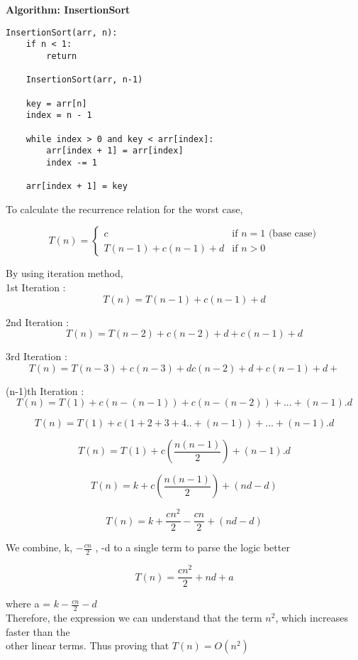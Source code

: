 \documentclass[11pt]{article}
\theoremstyle{definition}
\begin{document}
\textbf{Algorithm: InsertionSort} 

\begin{verbatim}
InsertionSort(arr, n):
    if n < 1:
        return

    InsertionSort(arr, n-1)

    key = arr[n]
    index = n - 1

    while index > 0 and key < arr[index]:
        arr[index + 1] = arr[index]
        index -= 1

    arr[index + 1] = key

\end{verbatim}
\begin{enumerate}

To calculate the recurrence relation for the worst case,

\[
T(n) = 
\begin{cases} 
    c & \text{if } n = 1 \text{ (base case)}\\
    T(n-1) + c(n-1) + d & \text{if } n > 0 
\end{cases}
\]

By using iteration method,\\

1st Iteration : \[ T(n) = T(n-1) + c(n-1) + d \]

2nd Iteration : \[ T(n) = T(n-2) + c(n-2) + d + c(n-1) + d \]

3rd Iteration : \[ T(n) = T(n-3) + c(n-3) + d c(n-2) + d + c(n-1) + d + \]

(n-1)th Iteration : \[ T(n) = T(1) + c(n-(n-1))+ c(n-(n-2)) + ... + (n-1).d \]

\[ T(n) = T(1) + c(1+2+3+4..+(n-1)) + ... + (n-1).d \]

\[ T(n) = T(1) + c(\frac{n(n-1)}{2}) + (n-1).d \]

\[ T(n) = k + c(\frac{n(n-1)}{2}) + (nd-d) \]

\[ T(n) = k + \frac{cn^2}{2} - \frac{cn}{2} + (nd-d) \]

We combine, k, $-\frac{cn}{2}$ , -d to a single term to parse the logic better

\[ T(n) = \frac{cn^2}{2} + nd + a \]

where a = $k - \frac{cn}{2} -d$ \\

Therefore, the expression we can understand that the term $n^2$, which increases faster than the \\
other linear terms. Thus proving that $T(n) = O(n^2)$


\end{enumerate}
\end{document}
